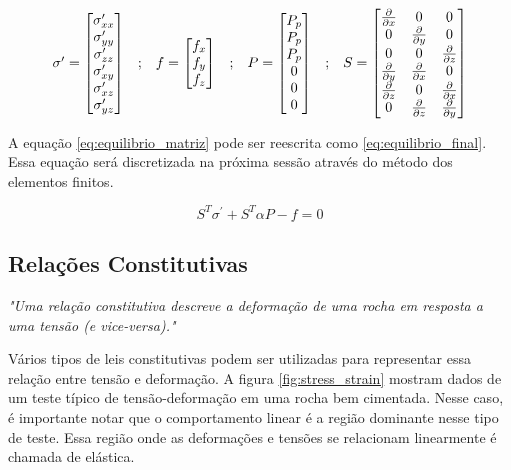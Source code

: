 \begin{equation}
\begin{matrix}
\sigma^\prime = \begin{bmatrix}
\sigma^\prime_{xx}
\\
\sigma^\prime_{yy}
\\
\sigma^\prime_{zz}
\\
\sigma^\prime_{xy}
\\
\sigma^\prime_{xz}
\\
\sigma^\prime_{yz}
\end{bmatrix}
&

;

&

f = \begin{bmatrix}
f_{x}
\\
f_{y}
\\
f_{z}
\end{bmatrix}
&
;
&

P = \begin{bmatrix} P_p \\ P_p \\ P_p \\0 \\ 0 \\ 0\end{bmatrix}

&
;

&
S = \begin{bmatrix} \frac{\partial { }}{\partial x} & 0 & 0 \\ 0 & \frac{\partial { }}{\partial y} & 0 \\ 0 & 0 & \frac{\partial { }}{\partial z} \\ \frac{\partial { }}{\partial y} & \frac{\partial { }}{\partial x} & 0 \\ \frac{\partial { }}{\partial z} & 0 & \frac{\partial { }}{\partial x} \\ 0 & \frac{\partial { }}{\partial z} & \frac{\partial { }}{\partial y} \end{bmatrix}
\end{matrix}
\end{equation}

A equação \ref{eq:equilibrio_matriz} pode ser reescrita como \ref{eq:equilibrio_final}. Essa equação será discretizada na próxima sessão através do método dos elementos finitos.

\begin{equation}
\label{eq:equilibrio_final}
S^T\sigma^\prime + S^T\alpha P - f = 0
\end{equation}


\subsection{Relações Constitutivas}

\textit{"Uma relação constitutiva descreve a deformação de uma rocha em resposta a uma tensão (e vice-versa)."} \cite{ResGeomec}


Vários tipos de leis constitutivas podem ser utilizadas para representar essa relação entre tensão e deformação. A figura \ref{fig:stress_strain} mostram dados de um teste típico de tensão-deformação em uma rocha bem cimentada. Nesse caso, é importante notar que o comportamento linear é a região dominante nesse tipo de teste. Essa região onde as deformações e tensões se relacionam linearmente é chamada de elástica.


